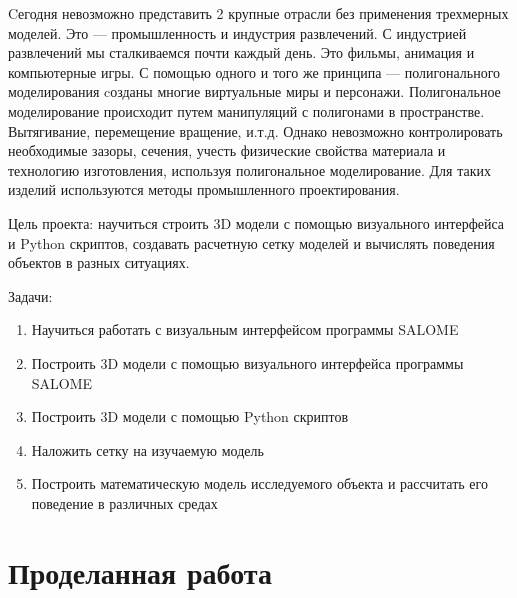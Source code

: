 \documentclass[a4paper,12pt]{article}
\theoremstyle{plain} %
\theoremstyle{definition} %
\theoremstyle{remark} %
\begin{document}
	Cегодня невозможно представить 2 крупные отрасли без применения трехмерных моделей. Это — промышленность и индустрия развлечений. С индустрией развлечений мы сталкиваемся почти каждый день. Это фильмы, анимация и компьютерные игры. С помощью одного и того же принципа — полигонального моделирования cозданы многие виртуальные миры и персонажи. Полигональное моделирование происходит путем манипуляций с полигонами в пространстве. Вытягивание, перемещение вращение,  и.т.д. Однако невозможно контролировать необходимые зазоры, сечения, учесть физические свойства материала и технологию изготовления, используя полигональное моделирование. Для таких изделий используются методы промышленного проектирования.

	Цель проекта: научиться строить 3D модели с помощью визуального интерфейса и Python скриптов, создавать расчетную сетку моделей и вычислять поведения объектов в разных ситуациях.

	Задачи: 
	\begin{enumerate}
	\item Научиться работать с визуальным интерфейсом программы SALOME
	\item Построить 3D модели с помощью визуального интерфейса программы SALOME
	\item Построить 3D модели с помощью Python скриптов
	\item Наложить сетку на изучаемую модель
	\item Построить математическую модель исследуемого объекта и рассчитать его поведение в различных средах
	\end{enumerate}
	
	\newpage
	\section{Проделанная работа}
	
\end{document}
